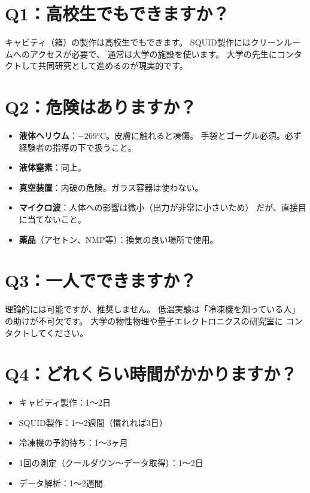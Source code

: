 \documentclass[12pt,a4paper]{article}
\begin{document}
\section*{Q1：高校生でもできますか？}

キャビティ（箱）の製作は高校生でもできます。
SQUID製作にはクリーンルームへのアクセスが必要で、
通常は大学の施設を使います。
大学の先生にコンタクトして共同研究として進めるのが現実的です。

\section*{Q2：危険はありますか？}

\begin{abunaibox}[安全上の注意]
\begin{itemize}
\item \textbf{液体ヘリウム}：$-269$°C。皮膚に触れると凍傷。
手袋とゴーグル必須。必ず経験者の指導の下で扱うこと。
\item \textbf{液体窒素}：同上。
\item \textbf{真空装置}：内破の危険。ガラス容器は使わない。
\item \textbf{マイクロ波}：人体への影響は微小（出力が非常に小さいため）
だが、直接目に当てないこと。
\item \textbf{薬品}（アセトン、NMP等）：換気の良い場所で使用。
\end{itemize}
\end{abunaibox}

\section*{Q3：一人でできますか？}

理論的には可能ですが、推奨しません。
低温実験は「冷凍機を知っている人」の助けが不可欠です。
大学の物性物理や量子エレクトロニクスの研究室に
コンタクトしてください。

\section*{Q4：どれくらい時間がかかりますか？}

\begin{itemize}
\item キャビティ製作：1〜2日
\item SQUID製作：1〜2週間（慣れれば3日）
\item 冷凍機の予約待ち：1〜3ヶ月
\item 1回の測定（クールダウン〜データ取得）：1〜2日
\item データ解析：1〜2週間
\end{itemize}
\end{document}
